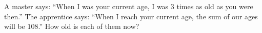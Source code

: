 A master says: ``When I was your current age, I was $3$ times as old as you were then.'' The apprentice says: ``When I reach your current age, the sum of our ages will be $108$.'' How old is each of them now?

